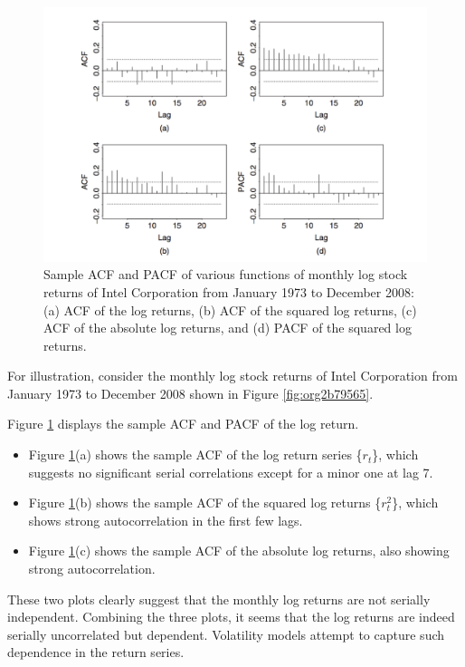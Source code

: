 \documentclass[a4paper,11pt]{article}
\begin{document}
\begin{figure}[htbp]
\centering
\includegraphics[width=\textwidth]{img/acf_intel.png}
\caption{\label{fig:orgca9e0cf}
Sample ACF and PACF of various functions of monthly log stock returns of Intel Corporation from January 1973 to December 2008: (a) ACF of the log returns, (b) ACF of the squared log returns, (c) ACF of the absolute log returns, and (d) PACF of the squared log returns.}
\end{figure}

For illustration, consider the monthly log stock returns of Intel
Corporation from January 1973 to December 2008 shown in Figure
\ref{fig:org2b79565}. 

Figure \ref{fig:orgca9e0cf} displays the sample ACF and PACF of the
log return. 
\begin{itemize}
\item Figure \ref{fig:orgca9e0cf}(a) shows the sample ACF of the log
return series \{\(r_t\)\}, which suggests no significant serial correlations
except for a minor one at lag 7.
\item Figure \ref{fig:orgca9e0cf}(b) shows the sample ACF of the squared log returns
\{\(r^2_t\)\}, which shows strong autocorrelation in the first few
lags.
\item Figure  \ref{fig:orgca9e0cf}(c) shows the sample ACF of the
absolute log returns, also showing strong autocorrelation.
\end{itemize}

These two plots clearly suggest that the monthly log returns are not
serially independent. Combining the three plots, it seems that the
log returns are indeed serially uncorrelated but
dependent. Volatility models attempt to capture such dependence in
the return series.
\end{document}
